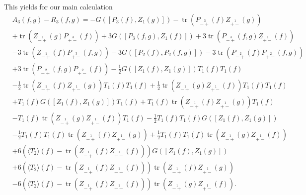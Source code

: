 \documentclass[oneside,reqno,12pt]{amsart}
\DeclareMathOperator{\tr}{tr}
\newcommand{\Z}[2]{Z_{\stackrel{1}{#1}}\left(#2\right)}
\begin{document}
This yields for our main calculation
\begin{align}\tag*{}
&A_3(f,g)-R_3(f,g)=
-  G\left(\left[P_3(f),Z_1(g)\right]\right) 
-\tr\left(P_{\stackrel{3}{-+}}(f) \Z{+-}{g}\right)\\\tag*{}
&+\tr\left(\Z{-+}{g}P_{\stackrel{3}{+-}}(f) \right)
+3 G\left(\left[P_3(f,g), Z_1(f)\right]\right)
+3 \tr\left(  P_{\stackrel{3}{-+}}(f,g) \Z{+-}{f}\right)\\\tag*{}
&-3 \tr\left(  \Z{-+}{f} P_{\stackrel{3}{+-}}(f,g) \right)
-3G\left(\left[P_2(f),P_2(f,g)\right]\right)
-3 \tr\left(P_{\stackrel{2}{-+}}(f) P_{\stackrel{2}{+-}}(f,g)\right)\\\tag*{}
&+3 \tr\left(P_{\stackrel{2}{-+}}(f,g) P_{\stackrel{2}{+-}}(f)\right)
-\frac{1}{2} G\left(\left[Z_1(f),Z_1(g)\right]\right) T_1(f) T_1(f)\\\tag*{}
&-\frac{1}{2} \tr \left(\Z{-+}{f}\Z{+-}{g}\right) T_1(f) T_1(f)
+\frac{1}{2} \tr \left(\Z{-+}{g}\Z{+-}{f}\right) T_1(f) T_1(f)\\\tag*{}
&+ T_1(f) G\left(\left[Z_1(f),Z_1(g)\right]\right) T_1(f)
+ T_1(f) \tr\left(\Z{-+}{f}\Z{+-}{g}\right) T_1(f)\\\tag*{}
&- T_1(f) \tr\left(\Z{-+}{g}\Z{+-}{f}\right) T_1(f)
-\frac{1}{2} T_1(f)T_1(f) G\left(\left[Z_1(f),Z_1(g)\right]\right)\\\tag*{}
&-\frac{1}{2} T_1(f)T_1(f) \tr\left(\Z{-+}{f} \Z{+-}{g}\right)
+\frac{1}{2} T_1(f)T_1(f) \tr\left(\Z{-+}{g} \Z{+-}{f}\right)\\\tag*{}
&+6 \left( \langle T_2\rangle(f) -\tr \left(\Z{-+}{f}\Z{+-}{f}\right)\right) G\left(\left[Z_1(f),Z_1(g)\right]\right)\\\tag*{}
&+6 \left( \langle T_2\rangle(f) -\tr \left(\Z{-+}{f}\Z{+-}{f}\right)\right) \tr\left(\Z{-+}{f} \Z{+-}{g}\right)\\
&-6 \left( \langle T_2\rangle(f) -\tr \left(\Z{-+}{f}\Z{+-}{f}\right)\right) \tr\left(\Z{-+}{g} \Z{+-}{f}\right)
.\end{align}
\end{document}
